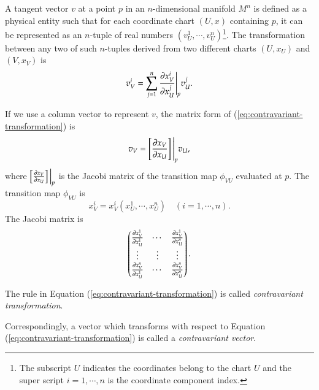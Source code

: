 \documentclass[11pt, a4paper]{book}
\begin{document}
\begin{Definition}
  A tangent vector $v$ at a point $p$ in an $n$-dimensional manifold $M^n$ is defined as a
  physical entity such that for each coordinate chart $(U,x)$ containing $p$, it can be
  represented as an $n$-tuple of real numbers $(v_U^1, \cdots, v_U^n)$\footnote{The
    subscript $U$ indicates the coordinates belong to the chart $U$ and the super script
    $i=1,\cdots,n$ is the coordinate component index.}. The transformation between any two
  of such $n$-tuples derived from two different charts $(U,x_U)$ and $(V,x_V)$ is
  \begin{equation}
    \label{eq:contravariant-transformation}
    v_V^i = \sum_{j=1}^n \frac{\partial x_V^i}{\partial x_U^j} \Bigg\vert_p v_U^j.
  \end{equation}
\end{Definition}
If we use a column vector to represent $v$, the matrix form of (\ref{eq:contravariant-transformation}) is
\begin{equation}
  \label{eq:contravariant-transformation-matrix-form}
  v_V = \left[ \frac{\partial x_{V}}{\partial x_U} \right] \Bigg\vert_p v_U,
\end{equation}
where $\left[ \frac{\partial x_{V}}{\partial x_U} \right]\Big\vert_p$ is the Jacobi matrix of the transition
map $\phi_{VU}$ evaluated at $p$. The transition map $\phi_{VU}$ is
\begin{equation}
  x_V^i = x_V^i(x_U^1, \cdots, x_U^n) \quad (i=1,\cdots,n).
\end{equation}
The Jacobi matrix is
\begin{equation}
  \begin{pmatrix}
    \frac{\partial x_V^1}{\partial x_U^1} & \cdots & \frac{\partial x_V^1}{\partial x_U^n} \\
    \vdots & \vdots & \vdots \\
    \frac{\partial x_V^n}{\partial x_U^1} & \cdots & \frac{\partial x_V^n}{\partial x_U^n}
  \end{pmatrix}.
\end{equation}

\begin{Definition}
  The rule in Equation (\ref{eq:contravariant-transformation}) is called
  \emph{contravariant transformation}.
\end{Definition}

\begin{Definition}
  Correspondingly, a vector which transforms with respect to Equation
  (\ref{eq:contravariant-transformation}) is called a \emph{contravariant vector}.
\end{Definition}
\end{document}
